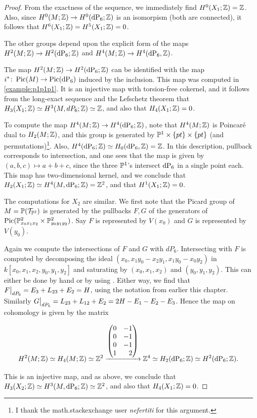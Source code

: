 \begin{proof}
From the exactness of the sequence, we immediately find $H^0(X_1;\Z)=\Z$. Also, since $H^0(M;\Z) \to H^0(\dP6;\Z)$ is an isomorpism (both are connected), it follows that $H^6(X_1;\Z)=H^5(X_1;\Z)=0$.

The other groups depend upon the explicit form of the maps $H^2(M;\Z) \to H^2(\dP6;\Z)$ and $H^4(M;\Z) \to H^4(\dP6,\Z)$.

The map $H^2(M;\Z) \to H^2(\dP6;\Z)$ can be identified with the map $i^\ast \colon \Pic(M) \to \Pic(\dP6)$ induced by the inclusion. This map was computed in \cref{example:p1p1p1}. It is an injective map with torsion-free cokernel, and it follows from the long-exact sequence and the Lefschetz theorem that $H_3(X_1;\Z) \simeq H^3(M,dP_6; \Z) \simeq \Z$, and also that $H_4(X_1;\Z)=0$.

To compute the map $H^4(M;\Z) \to H^4(\dP6;\Z)$, note that $H^4(M;\Z)$ is Poincaré dual to $H_ 2(M;\Z)$, and this group is generated by $\P^1 \times \{pt\} \times \{ pt\}$ (and permutations)\footnote{I thank the math.stackexchange user \emph{nefertiti} for this argument.}. Also, $H^4(\dP6;\Z) \simeq H_0(\dP6,\Z)=\Z$. In this description, pullback corresponds to intersection, and one sees that the map is given by $(a,b,c) \mapsto a+b+c$, since the three $\P^1$'s intersect $\dP6$ in a single point each. This map has two-dimensional kernel, and we conclude that $H_2(X_1;\Z) \simeq H^4(M,\dP6;\Z) = \Z^2$, and that $H^1(X_1;\Z)=0$.

The computations for $X_2$ are similar. We first note that the Picard group of $M=\P(\mathcal T_{\P^2})$ is generated by the pullbacks $F,G$ of the generators of $\Pic(\P^2_{x_0x_1x_2} \times \P^2_{y_0y_1y_2})$. Say $F$ is represented by $V(x_0)$ and $G$ is represented by $V(y_0)$.

Again we compute the intersections of $F$ and $G$ with $dP_6$. Intersecting with $F$ is computed by decomposing the ideal $(x_0,x_1y_0-x_2y_1,x_1y_0-x_0y_2)$ in $k[x_0,x_1,x_2,y_0,y_1,y_2]$ and saturating by $(x_0,x_1,x_2)$ and $(y_0,y_1,y_2)$. This can either be done by hand or by using \MM. Either way, we find that $\restr{F}{dP_6} = E_3+L_{23} + E_2=H$, using the notation from earlier this chapter. Similarly $\restr{G}{dP_6}=L_{23}+L_{12}+E_2=2H-E_1-E_2-E_3$. Hence the map on cohomology is given by the matrix

\[
H^2(M;\Z) \simeq H_4(M;\Z) \simeq \Z^2 \xrightarrow{
	\begin{pmatrix*}[r]
	0 & -1 \\
	0 & -1 \\
	0 & -1  \\
	1 & 2 
	\end{pmatrix*}
} \Z^4 \simeq H_2(\dP6;\Z) \simeq H^2(\dP6;\Z).
\]

This is an injective map, and as above, we conclude that $H_3(X_2;\Z) \simeq H^3(M,\dP6;\Z) \simeq \Z^2$, and also that $H_4(X_1;\Z)=0$.
\end{proof}

